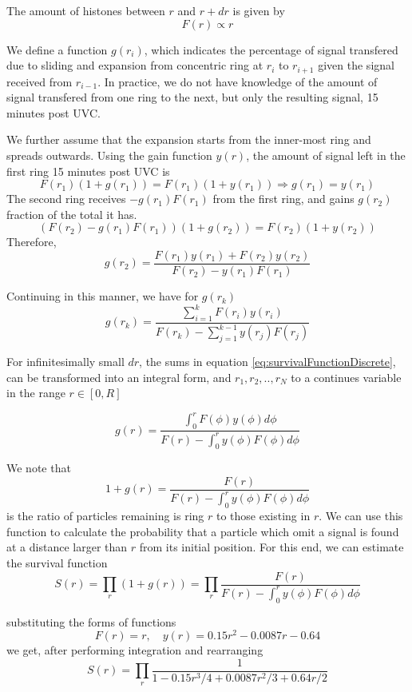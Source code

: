 \documentclass[12pt]{report}
\begin{document}
The amount of histones between $r$ and $r+dr$ is given by 
\begin{equation*}
F(r) \propto r
\end{equation*}

We define a function $g(r_i)$, which indicates the percentage of signal transfered due to sliding and expansion from concentric ring at $r_i$ to $r_{i+1}$ given the signal received from $r_{i-1}$. In practice, we do not have knowledge of the amount of signal transfered from one ring to the next, but only the resulting signal, 15 minutes post UVC. 

We further assume that the expansion starts from the inner-most ring and spreads outwards. Using the gain function $y(r)$, the amount of signal left in the first ring 15 minutes post UVC is
\begin{equation*}
F(r_1)(1+g(r_1)) = F(r_1)(1+y(r_1)) \Rightarrow g(r_1)=y(r_1)
\end{equation*}
The second ring receives $-g(r_1)F(r_1)$ from the first ring, and gains $g(r_2)$ fraction of the total it has. 
\begin{equation*}
(F(r_2)-g(r_1)F(r_1))(1+g(r_2))= F(r_2)(1+y(r_2))
\end{equation*}
Therefore, 
\begin{equation*}
 g(r_2)=\frac{F(r_1)y(r_1)+F(r_2)y(r_2)}{F(r_2)-y(r_1)F(r_1)}
\end{equation*}

Continuing in this manner, we have for $g(r_k)$
\begin{equation}\label{eq:survivalFunctionDiscrete}
g(r_k) =\frac{\sum_{i=1}^k F(r_i)y(r_i)}{F(r_k)-\sum_{j=1}^{k-1}y(r_j)F(r_j)} 
\end{equation} 

For infinitesimally small $dr$, the sums in equation \ref{eq:survivalFunctionDiscrete}, can be transformed into an integral form, and $r_1,r_2,..,r_N$ to a continues variable in the range $r\in [0, R]$

\begin{equation}\label{eq:survivalFunctionContinuous}
g(r) =\frac{\int_{0}^r F(\phi)y(\phi)d\phi}{F(r)-\int_{0}^{r}y(\phi)F(\phi)d\phi} 
\end{equation}

We note that
\begin{equation*}
1+g(r) =\frac{F(r)}{F(r)-\int_0^r y(\phi)F(\phi)d\phi}
\end{equation*}
is the ratio of particles remaining is ring $r$ to those existing in $r$. We can use this function to calculate the probability that a particle which omit a signal is found at a distance larger than $r$ from its initial position. For this end, we can estimate the survival function 
\begin{equation*}
S(r)=\prod_r (1+g(r)) =\prod_r \frac{F(r)}{F(r)-\int_0^r y(\phi)F(\phi)d\phi}
\end{equation*}


substituting the forms of functions
\begin{equation*}
F(r)=r, \quad y(r) =0.15r^2 -0.0087r-0.64
\end{equation*}
 we get, after performing integration and rearranging
\begin{equation}
S(r) =	\prod_r \frac{1}{1-0.15r^3/4 +0.0087r^2/3 +0.64r/2}
\end{equation}

 
\end{document}
